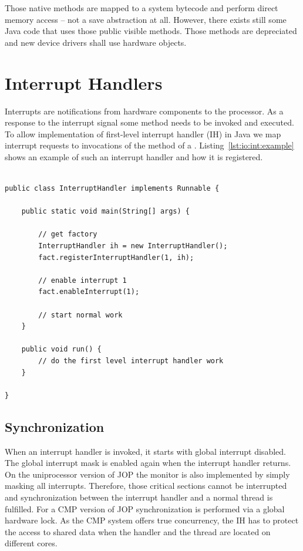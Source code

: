 Those native methods are mapped to a system bytecode and perform
direct memory access -- not a save abstraction at all. However, there
exists still some Java code that uses those public visible methods.
Those methods are depreciated and new device drivers shall use
hardware objects.

\section{Interrupt Handlers}


Interrupts are notifications from hardware components to the
processor. As a response to the interrupt signal some method needs to
be invoked and executed. To allow implementation of first-level
interrupt handler (IH) in Java we map interrupt requests to
invocations of the  method of a .
Listing~\ref{lst:io:int:example} shows an example of such an
interrupt handler and how it is registered.

\begin{lstlisting}[caption={A simple first-level interrupt handler in Java},
label=lst:io:int:example]

public class InterruptHandler implements Runnable {

    public static void main(String[] args) {

        // get factory
    	InterruptHandler ih = new InterruptHandler();
    	fact.registerInterruptHandler(1, ih);
    	
    	// enable interrupt 1
    	fact.enableInterrupt(1);

        // start normal work
    }

    public void run() {
    	// do the first level interrupt handler work
    }

}
\end{lstlisting}

\subsection{Synchronization}


When an interrupt handler is invoked, it starts with global interrupt
disabled. The global interrupt mask is enabled again when the
interrupt handler returns. On the uniprocessor version of JOP the
monitor is also implemented by simply masking all interrupts.
Therefore, those critical sections cannot be interrupted and
synchronization between the interrupt handler and a normal thread is
fulfilled. For a CMP version of JOP synchronization is performed via
a global hardware lock. As the CMP system offers true concurrency,
the IH has to protect the access to shared data when the handler and
the thread are located on different cores.

